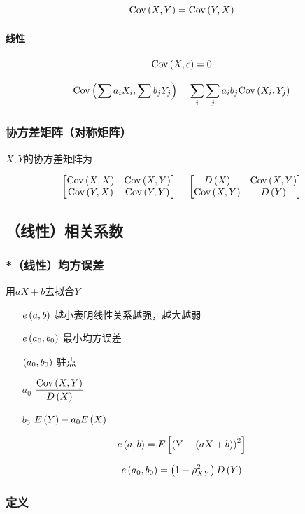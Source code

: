 \documentclass{article}
\begin{document}
\[\mathrm{Cov}\left(X,Y\right)=\mathrm{Cov}\left(Y,X\right)\]

\paragraph{线性}

\[\mathrm{Cov}\left(X,c\right)=0\]

\[\mathrm{Cov}\left(\sum a_iX_i,\sum b_jY_j\right)=\sum_i\sum_ja_ib_j\mathrm{Cov}\left(X_i,Y_j\right)\]

\subsubsection{协方差矩阵（对称矩阵）}

$X,Y$的协方差矩阵为

\[\begin{bmatrix}
        \mathrm{Cov}\left(X,X\right) & \mathrm{Cov}\left(X,Y\right) \\
        \mathrm{Cov}\left(Y,X\right) & \mathrm{Cov}\left(Y,Y\right)
    \end{bmatrix}=
    \begin{bmatrix}
        D\left(X\right)  & \mathrm{Cov}\left(X,Y\right) \\
        \mathrm{Cov}\left(X,Y\right) & D\left(Y\right)
    \end{bmatrix}\]

\subsection{（线性）相关系数}

\subsubsection{*（线性）均方误差}

用$aX+b$去拟合$Y$

\begin{enumerate}
    \item [$e\left(a,b\right)$] 越小表明线性关系越强，越大越弱
    \item [$e\left(a_0,b_0\right)$] 最小均方误差
    \item [$\left(a_0,b_0\right)$] 驻点
    \item [$a_0$] $\dfrac{\mathrm{Cov}\left(X,Y\right)}{D\left(X\right)}$
    \item [$b_0$] $E\left(Y\right)-a_0E\left(X\right)$
\end{enumerate}

\[e\left(a,b\right)=E\left[{\left(Y-\left(aX+b\right)\right)}^2\right]\]

\[e\left(a_0,b_0\right)=\left(1-\rho^2_{XY}\right)D\left(Y\right)\]

\subsubsection{定义}
\end{document}
